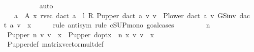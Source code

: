 \begin{isabellebody}
\ \ \ \ \ \ \isamarkupfalse%
\ {}\ \isamarkupfalse%
\ auto\isanewline
\ \ \ \ \isamarkupfalse%
\ \isamarkupfalse%
\ {\isachardoublequoteopen}{\isasymdots}\ {\isacharequal}{\kern0pt}\ {\isacharparenleft}{\kern0pt}{\isasymSqunion}a\ {\isasymin}\ A\ x{\isachardot}{\kern0pt}\ {\isacharparenleft}{\kern0pt}r{\isacharunderscore}{\kern0pt}vec\ {\isacharparenleft}{\kern0pt}d{\isacharunderscore}{\kern0pt}act\ a{\isacharparenright}{\kern0pt}\ {\isacharplus}{\kern0pt}\ l\ {\isacharasterisk}{\kern0pt}\isactrlsub R\ {\isacharparenleft}{\kern0pt}P{\isacharunderscore}{\kern0pt}upper\ {\isacharparenleft}{\kern0pt}d{\isacharunderscore}{\kern0pt}act\ a{\isacharparenright}{\kern0pt}\ {\isacharasterisk}{\kern0pt}v\ v\ {\isacharplus}{\kern0pt}\ P{\isacharunderscore}{\kern0pt}lower\ {\isacharparenleft}{\kern0pt}d{\isacharunderscore}{\kern0pt}act\ a{\isacharparenright}{\kern0pt}\ {\isacharasterisk}{\kern0pt}v\ {\isacharparenleft}{\kern0pt}GS{\isacharunderscore}{\kern0pt}inv\ {\isacharparenleft}{\kern0pt}d{\isacharunderscore}{\kern0pt}act\ a{\isacharparenright}{\kern0pt}\ v{\isacharparenright}{\kern0pt}{\isacharparenright}{\kern0pt}{\isacharparenright}{\kern0pt}\ {\isachardollar}{\kern0pt}\ x{\isacharparenright}{\kern0pt}{\isachardoublequoteclose}\isanewline
\ \ \ \ \isamarkupfalse%
\ {\isacharparenleft}{\kern0pt}rule\ antisym{\isacharcomma}{\kern0pt}\ rule\ cSUP{\isacharunderscore}{\kern0pt}mono{\isacharcomma}{\kern0pt}\ goal{\isacharunderscore}{\kern0pt}cases{\isacharparenright}{\kern0pt}\isanewline
\ \ \ \ \ \ \isamarkupfalse%
\ {\isacharparenleft}{\kern0pt}{}\ n{\isacharparenright}{\kern0pt}\isanewline
\ \ \ \ \ \ \isamarkupfalse%
\ \isamarkupfalse%
\ {\isachardoublequoteopen}{\isacharparenleft}{\kern0pt}P{\isacharunderscore}{\kern0pt}upper\ n\ {\isacharasterisk}{\kern0pt}v\ v{\isacharparenright}{\kern0pt}\ {\isachardollar}{\kern0pt}\ x\ {\isasymle}\ {\isacharparenleft}{\kern0pt}P{\isacharunderscore}{\kern0pt}upper\ {\isacharparenleft}{\kern0pt}d{\isacharunderscore}{\kern0pt}opt{\isacharparenleft}{\kern0pt}x\ {\isacharcolon}{\kern0pt}{\isacharequal}{\kern0pt}\ n\ x{\isacharparenright}{\kern0pt}{\isacharparenright}{\kern0pt}\ {\isacharasterisk}{\kern0pt}v\ v{\isacharparenright}{\kern0pt}\ {\isachardollar}{\kern0pt}\ x{\isachardoublequoteclose}\isanewline
\ \ \ \ \ \ \ \ \isamarkupfalse%
\ P{\isacharunderscore}{\kern0pt}upper{\isacharunderscore}{\kern0pt}def\ matrix{\isacharunderscore}{\kern0pt}vector{\isacharunderscore}{\kern0pt}mult{\isacharunderscore}{\kern0pt}def\isanewline

\end{isabellebody}
